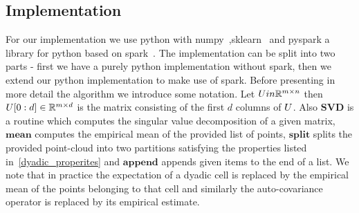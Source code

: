 \documentclass{article}
\begin{document}
  \subsection{Implementation}
  For our implementation we use python with numpy~\cite{van2011numpy},sklearn~\cite{pedregosa2011scikit} and pyspark a library for python based on spark~\cite{zaharia2010spark}. The implementation can be split into two parts - first we have a purely python implementation without spark, then we extend our python implementation to make use of spark. Before presenting in more detail the algorithm we introduce some notation. Let ${U} in \mathbb{R}^{m\times n}$ then ${U}[0:d] \in \mathbb{R}^{m\times d}$ is the matrix consisting of the first $d$ columns of ${U}$. Also $\mathbf{SVD}$ is a routine which computes the singular value decomposition of a given matrix, $\mathbf{mean}$ computes the empirical mean of the provided list of points, $\mathbf{split}$ splits the provided point-cloud into two partitions satisfying the properties listed in~\ref{dyadic_properites} and $\mathbf{append}$ appends given items to the end of a list. We note that in practice the expectation of a dyadic cell is replaced by the empirical mean of the points belonging to that cell and similarly the auto-covariance operator is replaced by its empirical estimate.\\
\end{document}
